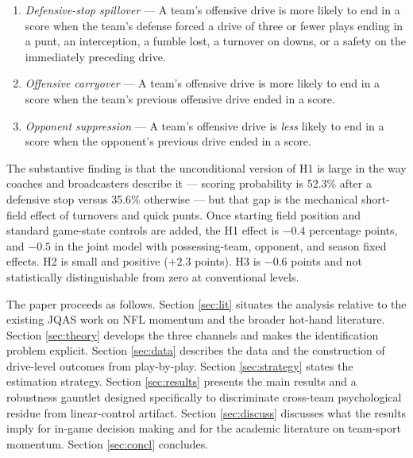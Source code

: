 \documentclass[11pt]{article}
\begin{document}
\begin{enumerate}
    \item[\textbf{H1.}] \emph{Defensive-stop spillover} --- A team's offensive
    drive is more likely to end in a score when the team's defense forced a
    drive of three or fewer plays ending in a punt, an interception, a fumble
    lost, a turnover on downs, or a safety on the immediately preceding drive.
    \item[\textbf{H2.}] \emph{Offensive carryover} --- A team's offensive drive
    is more likely to end in a score when the team's previous offensive drive
    ended in a score.
    \item[\textbf{H3.}] \emph{Opponent suppression} --- A team's offensive
    drive is \emph{less} likely to end in a score when the opponent's previous
    drive ended in a score.
\end{enumerate}

The substantive finding is that the unconditional version of H1 is large in
the way coaches and broadcasters describe it --- scoring probability is
52.3\% after a defensive stop versus 35.6\% otherwise --- but that gap
is the mechanical short-field effect of turnovers and quick punts. Once
starting field position and standard game-state controls are added, the H1
effect is $-0.4$ percentage points, and $-0.5$ in the joint model with
possessing-team, opponent, and season fixed effects. H2 is small and
positive ($+2.3$ points). H3 is $-0.6$ points and not
statistically distinguishable from zero at conventional levels.

The paper proceeds as follows. Section \ref{sec:lit} situates the analysis
relative to the existing JQAS work on NFL momentum and the broader hot-hand
literature. Section \ref{sec:theory} develops the three channels and makes
the identification problem explicit. Section \ref{sec:data} describes the
data and the construction of drive-level outcomes from play-by-play.
Section \ref{sec:strategy} states the estimation strategy. Section
\ref{sec:results} presents the main results and a robustness gauntlet
designed specifically to discriminate cross-team psychological residue from
linear-control artifact. Section \ref{sec:discuss} discusses what the results
imply for in-game decision making and for the academic literature on
team-sport momentum. Section \ref{sec:concl} concludes.
\end{document}
